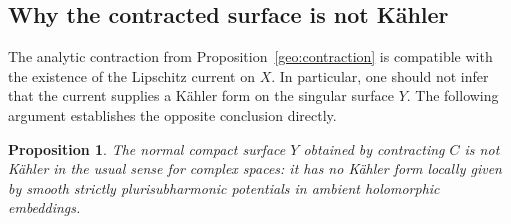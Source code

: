 \documentclass[11pt,a4paper]{article}
\numberwithin{equation}{section}
\newtheorem{proposition}[theorem]{Proposition}
\theoremstyle{definition}
\theoremstyle{remark}
\begin{document}
\subsection{Why the contracted surface is not K\"ahler}

The analytic contraction from Proposition~\ref{geo:contraction} is compatible
with the existence of the Lipschitz current on $X$. In particular,
one should not infer that the current supplies a K\"ahler form on
the singular surface $Y$. The following argument establishes the
opposite conclusion directly.

\begin{proposition}\label{con:nonkahler}
The normal compact surface $Y$ obtained by contracting $C$ is not
K\"ahler in the usual sense for complex spaces: it has no K\"ahler
form locally given by smooth strictly plurisubharmonic potentials
in ambient holomorphic embeddings.
\end{proposition}
\end{document}
